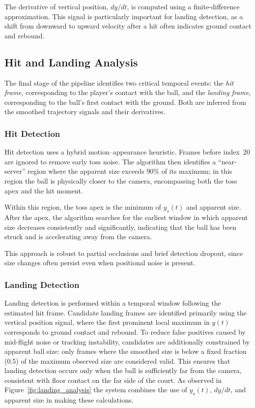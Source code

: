 The derivative of vertical position, $dy/dt$, is computed using a finite-difference approximation. This signal is particularly important for landing detection, as a shift from downward to upward velocity after a hit often indicates ground contact and rebound.

\subsection{Hit and Landing Analysis}

The final stage of the pipeline identifies two critical temporal events: the \emph{hit frame}, corresponding to the player's contact with the ball, and the \emph{landing frame}, corresponding to the ball’s first contact with the ground. Both are inferred from the smoothed trajectory signals and their derivatives.

\subsubsection{Hit Detection}

Hit detection uses a hybrid motion–appearance heuristic. Frames before index~20 are ignored to remove early toss noise. The algorithm then identifies a ``near-server'' region where the apparent size exceeds 90\% of its maximum; in this region the ball is physically closer to the camera, encompassing both the toss apex and the hit moment.

Within this region, the toss apex is the minimum of $y_s(t)$ and apparent size. After the apex, the algorithm searches for the earliest window in which apparent size decreases consistently and significantly, indicating that the ball has been struck and is accelerating away from the camera.

This approach is robust to partial occlusions and brief detection dropout, since size changes often persist even when positional noise is present.

\subsubsection{Landing Detection}

Landing detection is performed within a temporal window following the estimated hit frame. Candidate landing frames are identified primarily using the vertical position signal, where the first prominent local maximum in $y(t)$ corresponds to ground contact and rebound. To reduce false positives caused by mid-flight noise or tracking instability, candidates are additionally constrained by apparent ball size: only frames where the smoothed size is below a fixed fraction (0.5) of the maximum observed size are considered valid. This ensures that landing detection occurs only when the ball is sufficiently far from the camera, consistent with floor contact on the far side of the court. As observed in Figure~\ref{fig:landing_analysis} the system combines the use of $y_s(t)$, $dy/dt$, and apparent size in making these calculations.

